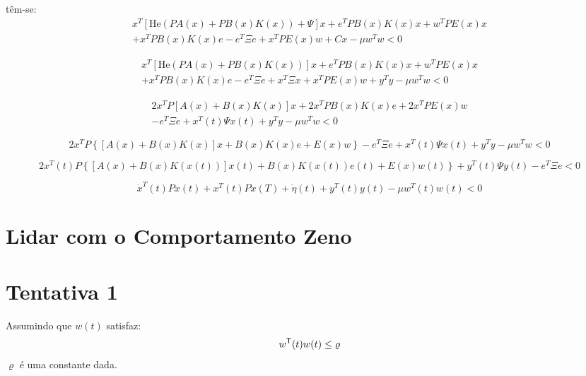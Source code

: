 têm-se:
\begin{multline}
  x^T \left[\text{He}(PA(x) + PB(x)K(x)) + \Psi\right] x + e^TPB(x)K(x) x + w^TPE(x) x \\
  +  x^TPB(x)K(x)e - e^T\Xi e +  x^TPE(x) w + Cx - \mu w^Tw < 0
\end{multline}

\begin{multline}
  x^T \left[\text{He}(PA(x) + PB(x)K(x))\right] x + e^TPB(x)K(x) x + w^TPE(x) x \\
  +  x^TPB(x)K(x)e - e^T\Xi e +  x^T \Xi x + x^TPE(x) w + y^Ty - \mu w^Tw < 0
\end{multline}


\begin{multline}
  2  x^T P \left[A(x) + B(x)K(x)\right] x + 2 x^TPB(x)K(x)e + 2 x^TPE(x)w \\
  - e^T\Xi e +  x^T(t) \Psi x(t) + y^Ty - \mu w^Tw < 0
\end{multline}


\begin{equation}
  2  x^T P \left\{\left[A(x) + B(x)K(x)\right]x + B(x)K(x)e + E(x)w\right\}
  - e^T\Xi e +  x^T(t) \Psi x(t) + y^Ty - \mu w^Tw < 0
\end{equation}



\begin{equation}
  2x^T(t)P\left\{\left[A(x) + B(x) K(x(t)) \right] x(t)  + B(x) K(x(t)) e(t) + E(x) w(t)\right\} + y^T(t) \Psi y(t) - e^T \Xi e < 0
\end{equation}



\begin{equation}
  \dot x^T(t)Px(t) + x^T(t)P\dot x(T) + \dot \eta(t) + y^T(t)y(t) - \mu w^T(t)w(t) < 0
\end{equation}

\section{Lidar com o Comportamento Zeno}

\section{Tentativa 1}

Assumindo que $w(t)$ satisfaz:
\begin{equation}
  w^{\sf{T}}(t) w(t) \leq \varrho
\end{equation}
$\varrho$ é uma constante dada.


